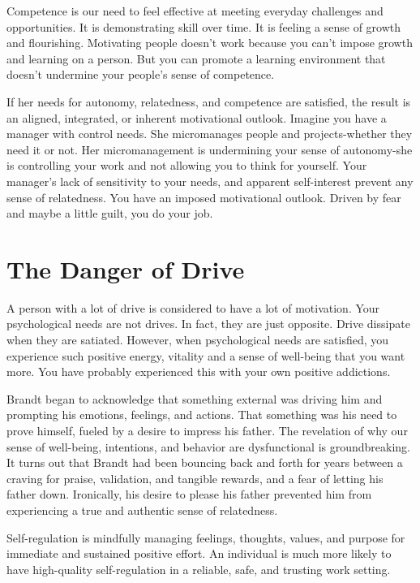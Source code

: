 \documentclass[ebook,12pt,oneside,openany]{memoir}
\begin{document}
Competence is our need to feel effective at meeting everyday challenges and opportunities. It is demonstrating skill over time. It is feeling a sense of growth and flourishing.
Motivating people doesn't work because you can't impose growth and learning on a person. But you can promote a learning environment that doesn't undermine your people's sense of competence.

If her needs for autonomy, relatedness, and competence are satisfied, the result is an aligned, integrated, or inherent motivational outlook. 
Imagine you have a manager with control needs. She micromanages people and projects-whether they need it or not.
Her micromanagement is undermining your sense of autonomy-she is controlling your work and not allowing you to think for yourself.
Your manager's lack of sensitivity to your needs, and apparent self-interest prevent any sense of relatedness.
You have an imposed motivational outlook. Driven by fear and maybe a little guilt, you do your job. 

\section{The Danger of Drive}
A person with a lot of drive is considered to have a lot of motivation. 
Your psychological needs are not drives. In fact, they are just opposite. Drive dissipate when they are satiated.
However, when psychological needs are satisfied, you experience such positive energy, vitality and a sense of well-being that you want more.
You have probably experienced this with your own positive addictions. 

Brandt began to acknowledge that something external was driving him and prompting his emotions, feelings, and actions.
That something was his need to prove himself, fueled by a desire to impress his father.
The revelation of why our sense of well-being, intentions, and behavior are dysfunctional is groundbreaking.
It turns out that Brandt had been bouncing back and forth for years between a craving for praise, validation, and tangible rewards, and a fear of letting his father down.
Ironically, his desire to please his father prevented him from experiencing a true and authentic sense of relatedness.

Self-regulation is mindfully managing feelings, thoughts, values, and purpose for immediate and sustained positive effort.
An individual is much more likely to have high-quality self-regulation in a reliable, safe, and trusting work setting.
\end{document}
